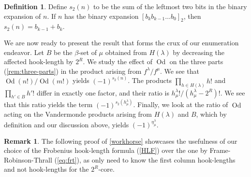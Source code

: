 \documentclass[12pt]{amsart}
\theoremstyle{definition}
\newtheorem{definition}[theorem]{Definition}
\newtheorem{remark}[theorem]{Remark}
\numberwithin{equation}{section}
\newcommand{\la}{\lambda}
\DeclareMathOperator{\Od}{Od}
\begin{document}
\begin{definition}
Define $s_2(n)$ to be the sum of the leftmost two bits in the binary expansion of $n$. If $n$ has the binary expansion $[b_kb_{k-1}\ldots b_0]_2$, then $s_2(n)= b_{k-1}+b_k$.
\end{definition}
We are now ready to present the result that forms the crux of our enumeration endeavor. Let $B$ be the $\beta$-set of $\mu$ obtained from $H(\la)$ by decreasing the affected hook-length by $2^R$. We study the effect of $\Od$ on the three parts (\cref{rem:three-parts}) in the product arising from $f^\la/ f^\mu$. We see that $\Od(n!)/\Od(m!)$ yields $(-1)^{s_2(n)}$. The products $\prod_{h\in H(\la)} h!$ and $\prod_{h'\in B} h'!$ differ in exactly one factor, and their ratio is $h^\la_\mu!/ (h^\la_\mu- 2^R)!$. We see that this ratio yields the term $(-1)^{s_2(h^\la_\mu)}$. Finally, we look at the ratio of $\Od$ acting on the Vandermonde products arising from $H(\la)$ and $B$, which by definition and our discussion above, yields $(-1)^{\eta^\la_\mu}$. 
\begin{remark}
    The following proof of \cref{workhorse} showcases the usefulness of our choice of the Frobenius hook-length formula (\cref{HLF}) over the one by Frame-Robinson-Thrall (\cref{eq:frt}), as only need to know the first column hook-lengths and not  hook-lengths for the $2^R$-core.
\end{remark}
\end{document}
